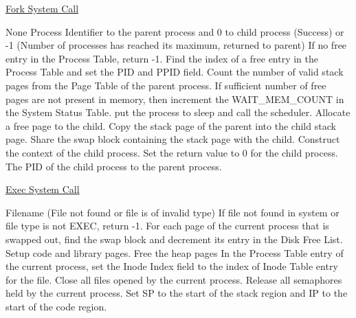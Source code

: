 

\begin{algorithm}
\caption{\href{http://exposnitc.github.io/os_design-files/fork.html}{Fork System Call}}
\begin{algorithmic}
\REQUIRE None
\ENSURE Process Identifier to the parent process and 0 to child process (Success) or -1 (Number of processes has reached its maximum, returned to parent)
\STATE If no free entry in the Process Table, return -1.  
\STATE Find the index of a free entry in the Process Table and set the PID and PPID field.   
\STATE Count the number of valid stack pages from the Page Table of the parent process.   
\STATE If sufficient number of free pages are not present in memory, then increment the WAIT\_MEM\_COUNT in the System Status Table.
    \STATE put the process to sleep and call the scheduler.
\ENDWHILE
{}
        \STATE Allocate a free page to the child.
        \STATE Copy the stack page of the parent into the child stack page.
        \ELSE 
            \STATE Share the swap block containing the stack page with the child.
    \ENDIF
\ENDFOR
\STATE Construct the context of the child process.
\STATE Set the return value to 0 for the child process.
\RETURN The PID of the child process to the parent process.

\end{algorithmic}
\end{algorithm}


\begin{algorithm}
\caption{\href{http://exposnitc.github.io/os_design-files/exec.html}{Exec System Call}}
\begin{algorithmic}
\REQUIRE Filename
 (File not found or file is of invalid type)
\STATE If file not found in system or file type is not EXEC, return -1. \STATE For each page of the current process that is swapped out, find the swap block and decrement its entry in the Disk Free List. 
\STATE Setup code and library pages.
\STATE Free the heap pages
\STATE In the Process Table entry of the current process, set the Inode Index field to the index of Inode Table entry for the file.
\STATE Close all files opened by the current process.     
\STATE Release all semaphores held by the current process.   
\STATE Set SP to the start of the stack region and IP to the start of the code region. 
\RETURN
\end{algorithmic}
\end{algorithm}


